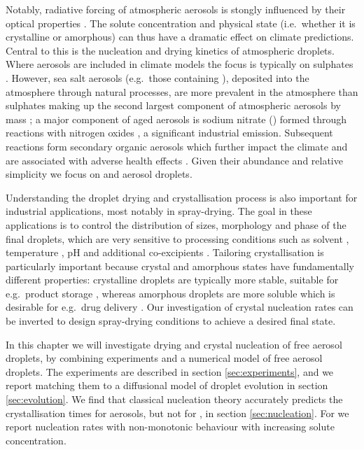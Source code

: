\documentclass[11pt,twoside]{report}
\begin{document}
Notably, radiative forcing of atmospheric aerosols is stongly influenced by their optical properties \cite{HodasACP2015,CotterellACP2017}.
The solute concentration and physical state (i.e.\ whether it is crystalline or amorphous) can thus have a dramatic effect on climate predictions.
Central to this is the nucleation and drying kinetics of atmospheric droplets.
Where aerosols are included in climate models the focus is typically on sulphates \cite{MannACP2014,ZhuNC2019}.
However, sea salt aerosols (e.g.\ those containing ), deposited into the atmosphere through natural processes, are more prevalent in the atmosphere than sulphates making up the second largest component of atmospheric aerosols by mass \cite{KeeneJAS1998}; a major component of aged  aerosols is sodium nitrate () formed through reactions with nitrogen oxides \cite{TolockaJPCA2004}, a significant industrial emission.
Subsequent reactions form secondary organic aerosols which further impact the climate \cite{ScottACP2014,PoschlCR2015} and are associated with adverse health effects \cite{PoschlCR2015}.
Given their abundance and relative simplicity we focus on  and  aerosol droplets.

Understanding the droplet drying and crystallisation process is also important for industrial applications, most notably in spray-drying.
The goal in these applications is to control the distribution of sizes, morphology and phase of the final droplets, which are very sensitive to processing conditions such as solvent \cite{CarverIECR2012,LintingreSM2016}, temperature \cite{IveyAST2018,YouDT2014,LinPT2015}, pH \cite{YuJPS2002,DubbiniIJP2014} and additional co-excipients \cite{ZhongAP2018,NandiyantoAPT2011,LyuJCG2017}.
Tailoring crystallisation is particularly important because crystal and amorphous states have fundamentally different properties: crystalline droplets are typically more stable, suitable for e.g.\ product storage \cite{VehringJAS2007,CostantinoJPS1998}, whereas amorphous droplets are more soluble which is desirable for e.g.\ drug delivery \cite{AmstadJPCB2016,BroughIJP2013}.
Our investigation of crystal nucleation rates can be inverted to design spray-drying conditions to achieve a desired final state.

In this chapter we will investigate drying and crystal nucleation of free aerosol droplets, by combining experiments and a numerical model of free aerosol droplets.
The experiments are described in section \ref{sec:experiments}, and we report matching them to a diffusional model of droplet evolution in section \ref{sec:evolution}.
We find that classical nucleation theory accurately predicts the crystallisation times for  aerosols, but not for , in section \ref{sec:nucleation}.
For  we report nucleation rates with non-monotonic behaviour with increasing solute concentration.
\end{document}
